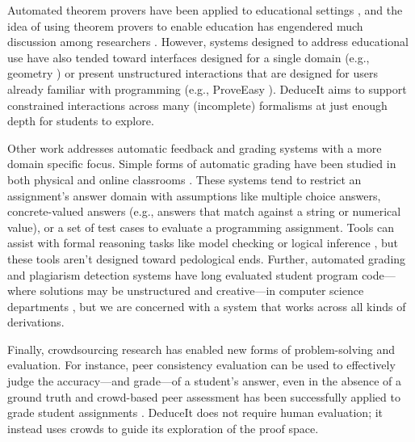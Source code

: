 \documentclass{sigchi}
\begin{document}

Automated theorem provers have been applied to educational settings \cite{suppes, suppes-prover, its, burstall}, and the idea of using theorem provers to enable education has engendered much discussion among researchers \cite{automated-grading, automated-scoring-design}. However, systems designed to address educational use have also tended toward interfaces designed for a single domain (e.g., geometry \cite{its}) or present unstructured interactions that are designed for users already familiar with programming (e.g., ProveEasy \cite{burstall}). DeduceIt aims to support constrained interactions across many (incomplete) formalisms at just enough depth for students to explore. %

Other work addresses automatic feedback and grading systems with a more domain specific focus. Simple forms of automatic grading have been studied in both physical and online classrooms \cite{auto-grade}. These systems tend to restrict an assignment's answer domain with assumptions like multiple choice answers, concrete-valued answers (e.g., answers that match against a string or numerical value), or a set of test cases to evaluate a programming assignment. Tools can assist with formal reasoning tasks like model checking or logical inference \cite{lapets}, but these tools aren't designed toward pedological ends. Further, automated grading and plagiarism detection systems have long evaluated student program code---where solutions may be unstructured and creative---in computer science departments \cite{grade-programs, moss}, but we are concerned with a system that works across all kinds of derivations.

Finally, crowdsourcing research has enabled new forms of problem-solving and evaluation. For instance, peer consistency evaluation can be used to effectively judge the accuracy---and grade---of a student's answer, even in the absence of a ground truth \cite{peer-consistency} and crowd-based peer assessment has been successfully applied to grade student assignments \cite{peer-assessment, chinmay-srk}. DeduceIt does not require human evaluation; it instead uses crowds to guide its exploration of the proof space.%
\end{document}

